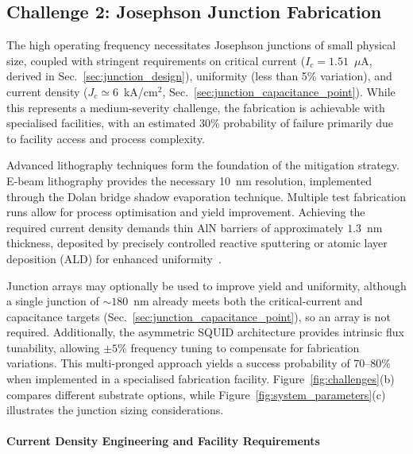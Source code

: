 \subsection{Challenge 2: Josephson Junction Fabrication}

The high operating frequency necessitates Josephson junctions of small physical size, coupled with stringent requirements on critical current ($I_c = 1.51$~$\mu$A, derived in Sec.~\ref{sec:junction_design}), uniformity (less than 5\% variation), and current density ($J_c \simeq 6$~kA/cm$^2$, Sec.~\ref{sec:junction_capacitance_point}). While this represents a medium-severity challenge, the fabrication is achievable with specialised facilities, with an estimated 30\% probability of failure primarily due to facility access and process complexity.

Advanced lithography techniques form the foundation of the mitigation strategy. E-beam lithography provides the necessary 10~nm resolution, implemented through the Dolan bridge shadow evaporation technique. Multiple test fabrication runs allow for process optimisation and yield improvement. Achieving the required current density demands thin AlN barriers of approximately $1.3$~nm thickness, deposited by precisely controlled reactive sputtering or atomic layer deposition (ALD) for enhanced uniformity~\cite{Wang2026ALDNitride}.

Junction arrays may optionally be used to improve yield and uniformity, although a single junction of $\sim 180$~nm already meets both the critical-current and capacitance targets (Sec.~\ref{sec:junction_capacitance_point}), so an array is not required. Additionally, the asymmetric SQUID architecture provides intrinsic flux tunability, allowing $\pm 5\%$ frequency tuning to compensate for fabrication variations. This multi-pronged approach yields a success probability of 70--80\% when implemented in a specialised fabrication facility. Figure~\ref{fig:challenges}(b) compares different substrate options, while Figure~\ref{fig:system_parameters}(c) illustrates the junction sizing considerations.

\paragraph{Current Density Engineering and Facility Requirements}

